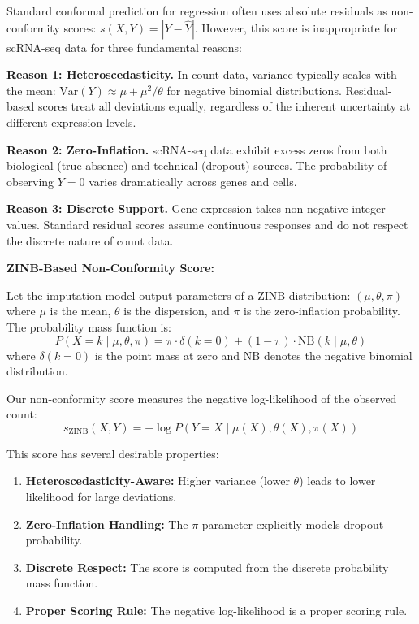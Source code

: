 \documentclass{article}
\begin{document}
Standard conformal prediction for regression often uses absolute residuals as non-conformity scores: $s(X, Y) = |Y - \hat{Y}|$. However, this score is inappropriate for scRNA-seq data for three fundamental reasons:

\textbf{Reason 1: Heteroscedasticity.} In count data, variance typically scales with the mean: $\text{Var}(Y) \approx \mu + \mu^2/\theta$ for negative binomial distributions. Residual-based scores treat all deviations equally, regardless of the inherent uncertainty at different expression levels.

\textbf{Reason 2: Zero-Inflation.} scRNA-seq data exhibit excess zeros from both biological (true absence) and technical (dropout) sources. The probability of observing $Y = 0$ varies dramatically across genes and cells.

\textbf{Reason 3: Discrete Support.} Gene expression takes non-negative integer values. Standard residual scores assume continuous responses and do not respect the discrete nature of count data.

\textbf{ZINB-Based Non-Conformity Score:}

Let the imputation model output parameters of a ZINB distribution: $(\mu, \theta, \pi)$ where $\mu$ is the mean, $\theta$ is the dispersion, and $\pi$ is the zero-inflation probability. The probability mass function is:
\begin{equation}
    P(X = k \mid \mu, \theta, \pi) = \pi \cdot \delta(k=0) + (1-\pi) \cdot \text{NB}(k \mid \mu, \theta)
\end{equation}
where $\delta(k=0)$ is the point mass at zero and NB denotes the negative binomial distribution.

Our non-conformity score measures the negative log-likelihood of the observed count:
\begin{equation}
    s_{\text{ZINB}}(X, Y) = -\log P(Y = X \mid \mu(X), \theta(X), \pi(X))
\end{equation}

This score has several desirable properties:
\begin{enumerate}
    \item \textbf{Heteroscedasticity-Aware:} Higher variance (lower $\theta$) leads to lower likelihood for large deviations.
    \item \textbf{Zero-Inflation Handling:} The $\pi$ parameter explicitly models dropout probability.
    \item \textbf{Discrete Respect:} The score is computed from the discrete probability mass function.
    \item \textbf{Proper Scoring Rule:} The negative log-likelihood is a proper scoring rule.
\end{enumerate}
\end{document}
